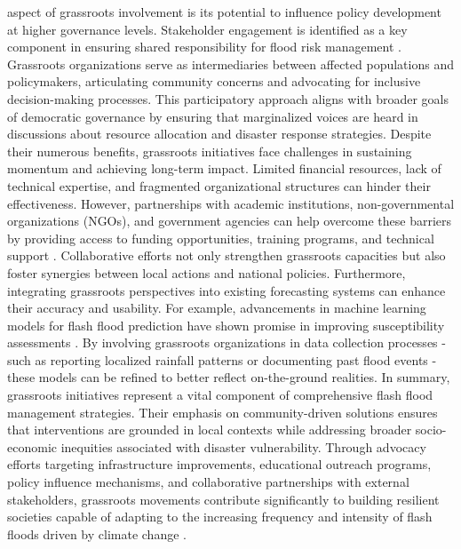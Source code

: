 aspect of grassroots involvement is its potential to influence policy development at higher governance levels. Stakeholder engagement is identified as a key component in ensuring shared responsibility for flood risk management \citep{Saad2024}. Grassroots organizations serve as intermediaries between affected populations and policymakers, articulating community concerns and advocating for inclusive decision-making processes. This participatory approach aligns with broader goals of democratic governance by ensuring that marginalized voices are heard in discussions about resource allocation and disaster response strategies. Despite their numerous benefits, grassroots initiatives face challenges in sustaining momentum and achieving long-term impact. Limited financial resources, lack of technical expertise, and fragmented organizational structures can hinder their effectiveness. However, partnerships with academic institutions, non-governmental organizations (NGOs), and government agencies can help overcome these barriers by providing access to funding opportunities, training programs, and technical support \citep{Ngo2018}\citep{Terti2015}. Collaborative efforts not only strengthen grassroots capacities but also foster synergies between local actions and national policies. Furthermore, integrating grassroots perspectives into existing forecasting systems can enhance their accuracy and usability. For example, advancements in machine learning models for flash flood prediction have shown promise in improving susceptibility assessments \citep{Ngo2018}. By involving grassroots organizations in data collection processes - such as reporting localized rainfall patterns or documenting past flood events - these models can be refined to better reflect on-the-ground realities. In summary, grassroots initiatives represent a vital component of comprehensive flash flood management strategies. Their emphasis on community-driven solutions ensures that interventions are grounded in local contexts while addressing broader socio-economic inequities associated with disaster vulnerability. Through advocacy efforts targeting infrastructure improvements, educational outreach programs, policy influence mechanisms, and collaborative partnerships with external stakeholders, grassroots movements contribute significantly to building resilient societies capable of adapting to the increasing frequency and intensity of flash floods driven by climate change \citep{AlRawas2024}\citep{Abegaz2024}\citep{Kastridis2020}\citep{Saad2024}.

